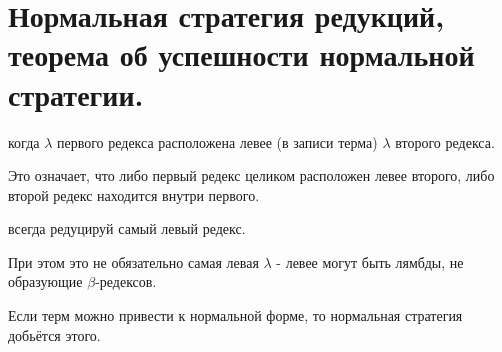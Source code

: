 \section{Нормальная стратегия редукций, теорема об успешности нормальной стратегии.}

\begin{definition}
    когда $\lambda$ первого редекса расположена левее (в записи терма) $\lambda$ второго редекса.
\end{definition}

Это означает, что либо первый редекс целиком
расположен левее второго, либо второй редекс находится
внутри первого.

\begin{definition}
    всегда редуцируй самый левый редекс.
\end{definition}

При этом это не обязательно самая левая $\lambda$ - левее могут быть лямбды, не образующие $\beta$-редексов.

\begin{theorem}
    Если терм можно привести к нормальной форме, то нормальная стратегия добьётся этого.
\end{theorem}
